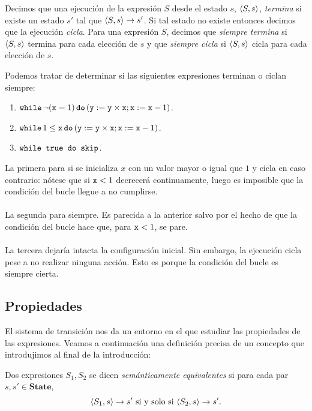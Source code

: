 \begin{definition}
Decimos que una ejecución de la expresión $S$ desde el estado $s$, $\langle S, s \rangle$, \textit{termina} si existe un estado $s'$ tal que $\langle S, s \rangle\rightarrow s'$. Si tal estado no existe entonces decimos que la ejecución \textit{cicla}. Para una expresión $S$, decimos que \textit{siempre termina} si $\langle S, s \rangle$ termina para cada elección de $s$ y que \textit{siempre cicla} si $\langle S, s \rangle$ cicla para cada elección de $s$.
\end{definition}

\begin{example}
Podemos tratar de determinar si las siguientes expresiones terminan o ciclan siempre:
\begin{enumerate}
    \item $\texttt{while} \, \neg(\texttt{x}=1) \, \texttt{do} \, (\texttt{y} := \texttt{y} \times \texttt{x}; \texttt{x} := \texttt{x} - 1)$.
    \item $\texttt{while} \, 1 \leq \texttt{x} \, \texttt{do} \, (\texttt{y} := \texttt{y} \times \texttt{x}; \texttt{x} := \texttt{x} - 1)$.
    \item $\texttt{while true do skip}$.
\end{enumerate}
La primera para si se inicializa $x$ con un valor mayor o igual que $1$ y cicla en caso contrario: nótese que si $\texttt{x}<1$ decrecerá continuamente, luego es imposible que la condición del bucle llegue a no cumplirse.\\ \\
La segunda para siempre. Es parecida a la anterior salvo por el hecho de que la condición del bucle hace que, para $\texttt{x}<1$, se pare. \\ \\
La tercera dejaría intacta la configuración inicial. Sin embargo, la ejecución cicla pese a no realizar ninguna acción. Esto es porque la condición del bucle es siempre cierta.
\end{example}

\subsection{Propiedades}

El sistema de transición nos da un entorno en el que estudiar las propiedades de las expresiones. Veamos a continuación una definición precisa de un concepto que introdujimos al final de la introducción:
\begin{definition}
Dos expresiones $S_1, S_2$ se dicen \textit{semánticamente equivalentes} si para cada par $s, s' \in \mathbf{State}$, 
$$\langle S_1, s \rangle\rightarrow s' \text{ si y solo si } \langle S_2, s \rangle\rightarrow s'.$$
\end{definition}


